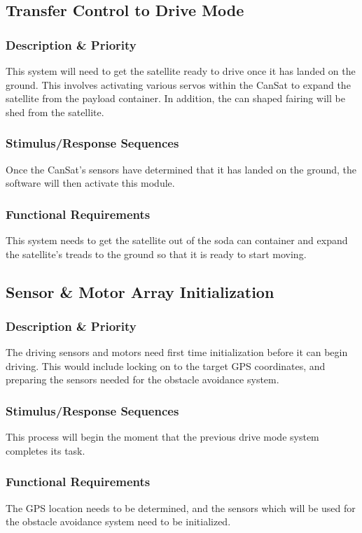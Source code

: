 \documentclass[10pt,onecolumn,draftclsnofoot,document]{IEEEtran}
\begin{document}
\subsection{Transfer Control to Drive Mode}
\subsubsection{Description \& Priority}
This system will need to get the satellite ready to drive once it has landed on the ground. This involves activating various servos within the CanSat to expand the satellite from the payload container. In addition, the can shaped fairing will be shed from the satellite.

\subsubsection{Stimulus/Response Sequences}
Once the CanSat's sensors have determined that it has landed on the ground, the software will then activate this module.

\subsubsection{Functional Requirements}
This system needs to get the satellite out of the soda can container and expand the satellite's treads to the ground so that it is ready to start moving.

\subsection{Sensor \& Motor Array Initialization}

\subsubsection{Description \& Priority}
The driving sensors and motors need first time initialization before it can begin driving. This would include locking on to the target GPS coordinates, and preparing the sensors needed for the obstacle avoidance system.

\subsubsection{Stimulus/Response Sequences}
This process will begin the moment that the previous drive mode system completes its task. 

\subsubsection{Functional Requirements}
The GPS location needs to be determined, and the sensors which will be used for the obstacle avoidance system need to be initialized. 
\end{document}
